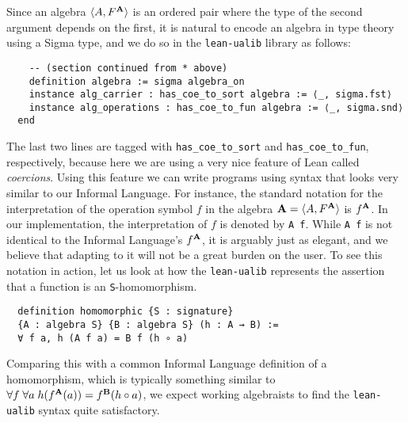 \documentclass[11pt]{amsart}  %
\begin{document}
Since an algebra $\langle A, F^{\mathbf{A}}\rangle$ is an ordered pair where the type of the second argument depends on the first, it is natural to encode an algebra in type theory using a Sigma type, and we do so in the \lstinline{lean-ualib} library as follows:
\begin{lstlisting}
    -- (section continued from * above)
    definition algebra := sigma algebra_on
    instance alg_carrier : has_coe_to_sort algebra := ⟨_, sigma.fst⟩
    instance alg_operations : has_coe_to_fun algebra := ⟨_, sigma.snd⟩
  end
\end{lstlisting}  
The last two lines are tagged with \lstinline{has_coe_to_sort} and \lstinline{has_coe_to_fun}, respectively, because here we are using a very nice feature of Lean called \emph{coercions}. Using this feature we can write programs using syntax that looks very similar to our Informal Language. For instance, the standard notation for the interpretation of the operation symbol $f$ in the algebra $\mathbf{A} = \langle A, F^{\mathbf{A}}\rangle$ is $f^{\mathbf{A}}$.  In our implementation, the interpretation of $f$ is denoted by \lstinline{A f}. While \lstinline{A f} is not identical to the Informal Language's $f^{\mathbf{A}}$, it is arguably just as elegant, and we believe that adapting to it will not be a great burden on the user. 
To see this notation in action, let us look at how the \lstinline{lean-ualib} represents the assertion that a function is an \lstinline{S}-homomorphism.
\begin{lstlisting}
  definition homomorphic {S : signature} 
  {A : algebra S} {B : algebra S} (h : A → B) := 
  ∀ f a, h (A f a) = B f (h ∘ a)
\end{lstlisting}
Comparing this with a common Informal Language definition of a homomorphism, which is typically something similar to $\forall f \; \forall a \; h (f^{\mathbf{A}} (a)) = f^{\mathbf{B}} (h \circ a)$, we expect working algebraists to find the \lstinline{lean-ualib} syntax quite satisfactory.
\end{document}
